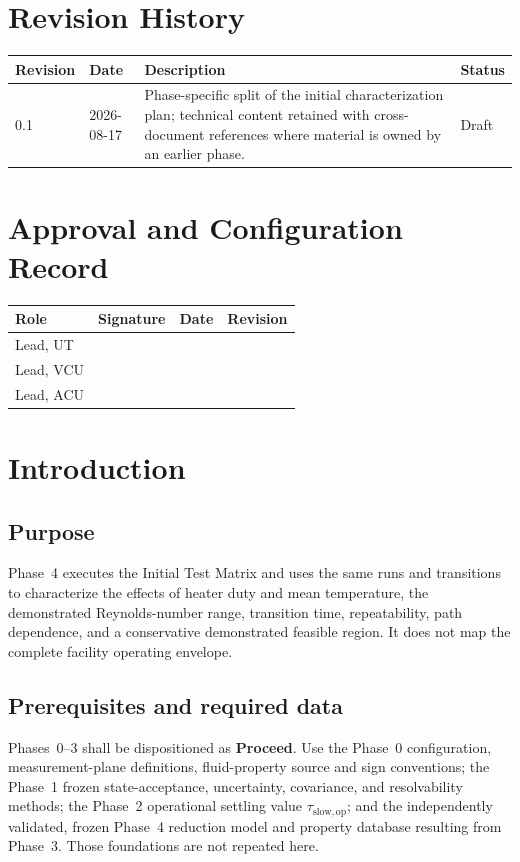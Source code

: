 \documentclass[11pt]{article}
\begin{document}
\clearpage
{}
\section*{Revision History}
\begin{tabularx}{\textwidth}{@{}p{0.75in}p{1.2in}>{\raggedright\arraybackslash}X>{\raggedright\arraybackslash}p{1.15in}@{}}
\toprule
\textbf{Revision} & \textbf{Date} & \textbf{Description} & \textbf{Status} \\
\midrule
0.1 & 2026-08-17 & Phase-specific split of the initial characterization plan; technical content retained with cross-document references where material is owned by an earlier phase. & Draft \\
\bottomrule
\end{tabularx}

\vspace{0.25in}
\section*{Approval and Configuration Record}
\begin{tabularx}{\textwidth}{@{}p{1.55in}X p{1.25in}p{1.05in}@{}}
\toprule
\textbf{Role} & \textbf{Signature} & \textbf{Date} & \textbf{Revision} \\
\midrule
Lead, UT & & & \\
Lead, VCU & & & \\
Lead, ACU & & & \\
\bottomrule
\end{tabularx}
\clearpage
\tableofcontents
\clearpage
{}

\section{Introduction}
\label{sec:introduction}
\subsection{Purpose}
Phase~4 executes the Initial Test Matrix and uses the same runs and transitions to characterize the effects of heater duty and mean temperature, the demonstrated Reynolds-number range, transition time, repeatability, path dependence, and a conservative demonstrated feasible region. It does not map the complete facility operating envelope.

\subsection{Prerequisites and required data}
Phases~0--3 shall be dispositioned as \textbf{Proceed}. Use the Phase~0 configuration, measurement-plane definitions, fluid-property source and sign conventions; the Phase~1 frozen state-acceptance, uncertainty, covariance, and resolvability methods; the Phase~2 operational settling value $\tau_{\mathrm{slow,op}}$; and the independently validated, frozen Phase~4 reduction model and property database resulting from Phase~3. Those foundations are not repeated here.
\end{document}
